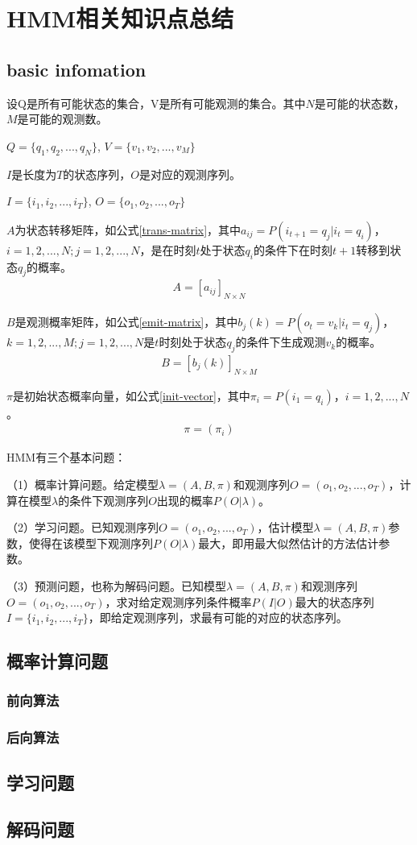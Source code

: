\section{HMM相关知识点总结}
\subsection{basic infomation}
设Q是所有可能状态的集合，V是所有可能观测的集合。其中$N$是可能的状态数，$M$是可能的观测数。
\begin{center}
$Q=\{q_1, q_2, ..., q_N\}$, $V = \{v_1, v_2, ..., v_M\}$
\end{center}

$I$是长度为$T$的状态序列，$O$是对应的观测序列。
\begin{center}
$I=\{i_1, i_2, ..., i_T\}$, $O = \{o_1, o_2, ..., o_T\}$
\end{center}

$A$为状态转移矩阵，如公式\ref{trans-matrix}，其中$a_{ij}=P(i_{t+1}=q_j|i_t=q_i)$，$i=1,2,...,N; j=1,2,...,N$，是在时刻$t$处于状态$q_i$的条件下在时刻$t+1$转移到状态$q_j$的概率。
\begin{align}
\label{trans-matrix}
A=[a_{ij}]_{N\times{N}}
\end{align}

$B$是观测概率矩阵，如公式\ref{emit-matrix}，其中$b_j(k)=P(o_t=v_k|i_t=q_j)$，$k=1,2,...,M; j=1,2,...,N$是$t$时刻处于状态$q_j$的条件下生成观测$v_k$的概率。
\begin{align}
\label{emit-matrix}
B=[b_{j}(k)]_{N\times{M}}
\end{align}

$\pi$是初始状态概率向量，如公式\ref{init-vector}，其中$\pi_i=P(i_1=q_i)$，$i=1,2,...,N$。
\begin{align}
\label{init-vector}
\pi = (\pi_i)
\end{align}

HMM有三个基本问题：

（1）概率计算问题。给定模型$\lambda=(A,B,\pi)$和观测序列$O=(o_1, o_2, ..., o_T)$，计算在模型$\lambda$的条件下观测序列$O$出现的概率$P(O|\lambda)$。

（2）学习问题。已知观测序列$O=(o_1, o_2, ..., o_T)$，估计模型$\lambda=(A,B,\pi)$参数，使得在该模型下观测序列$P(O|\lambda)$最大，即用最大似然估计的方法估计参数。

（3）预测问题，也称为解码问题。已知模型$\lambda=(A,B,\pi)$和观测序列$O=(o_1, o_2, ..., o_T)$，求对给定观测序列条件概率$P(I|O)$最大的状态序列$I=\{i_1, i_2, ..., i_T\}$，即给定观测序列，求最有可能的对应的状态序列。

\subsection{概率计算问题}
\subsubsection{前向算法}

\subsubsection{后向算法}

\subsection{学习问题}

\subsection{解码问题}
